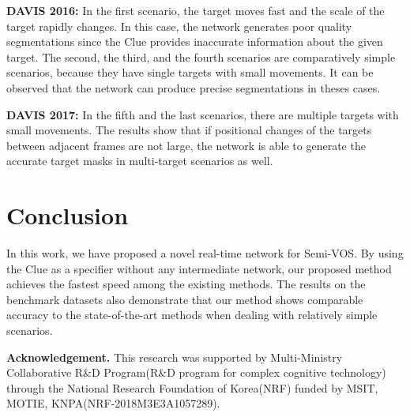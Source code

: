 \documentclass{article}
\begin{document}
\vspace{1mm}
\noindent\textbf{DAVIS 2016:} In the first scenario, the target moves fast and the scale of the target rapidly changes. In this case, the network generates poor quality segmentations since the Clue provides inaccurate information about the given target. The second, the third, and the fourth scenarios are comparatively simple scenarios, because they have single targets with small movements. It can be observed that the network can produce precise segmentations in theses cases.


\vspace{1mm}
\noindent\textbf{DAVIS 2017:} In the fifth and the last scenarios, there are multiple targets with small movements. The results show that if positional changes of the targets between adjacent frames are not large, the network is able to generate the accurate target masks in multi-target scenarios as well. 



\section{Conclusion}
In this work, we have proposed a novel real-time network for Semi-VOS. By using the Clue as a specifier without any intermediate network, our proposed method achieves the fastest speed among the existing methods. The results on the benchmark datasets also demonstrate that our method shows comparable accuracy to the state-of-the-art methods when dealing with relatively simple scenarios. 

\vspace*{\fill}
\noindent\footnotesize\textbf{Acknowledgement. }This research was supported by Multi-Ministry Collaborative R\&D Program(R\&D program for complex cognitive technology) through the National Research Foundation of Korea(NRF) funded by MSIT, MOTIE, KNPA(NRF-2018M3E3A1057289).





\clearpage

\small 
\end{document}

